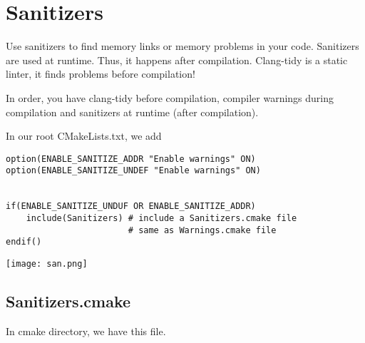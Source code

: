 \section{Sanitizers}

Use sanitizers to find memory links or memory problems in your code. Sanitizers are used at runtime. 
Thus, it happens after compilation. Clang-tidy is a static linter, it finds problems before compilation!  

In order, you have clang-tidy before compilation, 
compiler warnings during compilation and sanitizers at runtime (after compilation).

In our root CMakeLists.txt, we add

\begin{verbatim}
option(ENABLE_SANITIZE_ADDR "Enable warnings" ON)
option(ENABLE_SANITIZE_UNDEF "Enable warnings" ON)


if(ENABLE_SANITIZE_UNDUF OR ENABLE_SANITIZE_ADDR)
    include(Sanitizers) # include a Sanitizers.cmake file
                        # same as Warnings.cmake file
endif()

\end{verbatim}

\begin{center}
    \texttt{[image: san.png]}
\end{center}


\subsection{Sanitizers.cmake}

In cmake directory, we have this file.


